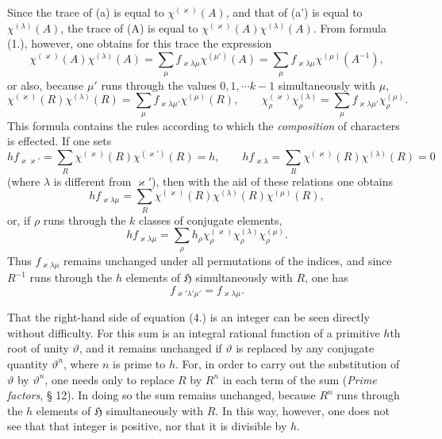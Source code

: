 \documentclass[11pt]{article}
\newcommand{\Hgr}{\mathfrak{H}}
\begin{document}
Since the trace of (a) is equal to $\chi^{(\varkappa)}(A)$, and that of (a') is equal to $\chi^{(\lambda)}(A)$, the trace of (A) is equal to $\chi^{(\varkappa)}(A)\chi^{(\lambda)}(A)$. From formula (1.), however, one obtains for this trace the expression
\[
\chi^{(\varkappa)}(A)\chi^{(\lambda)}(A)
 =\sum_\mu f_{\varkappa\lambda\mu}\chi^{(\mu')}(A)
 =\sum_\mu f_{\varkappa\lambda\mu}\chi^{(\mu)}(A^{-1}),
\]
or also, because $\mu'$ runs through the values $0,1,\cdots k-1$ simultaneously with $\mu$,
\begin{equation*}\tag{2.}
\chi^{(\varkappa)}(R)\chi^{(\lambda)}(R)
=\sum_\mu f_{\varkappa\lambda\mu'}\chi^{(\mu)}(R),
\qquad
\chi_\rho^{(\varkappa)}\chi_\rho^{(\lambda)}
=\sum_\mu f_{\varkappa\lambda\mu'}\chi_\rho^{(\mu)}.
\end{equation*}
This formula contains the rules according to which the \emph{composition} of characters is effected. If one sets
\begin{equation*}\tag{3.}
h f_{\varkappa\varkappa'}=\sum_R \chi^{(\varkappa)}(R)\chi^{(\varkappa')}(R)=h,
\qquad
h f_{\varkappa\lambda}=\sum_R \chi^{(\varkappa)}(R)\chi^{(\lambda)}(R)=0
\end{equation*}
(where $\lambda$ is different from $\varkappa'$), then with the aid of these relations one obtains
\begin{equation*}\tag{4.}
h f_{\varkappa\lambda\mu}=\sum_R \chi^{(\varkappa)}(R)\chi^{(\lambda)}(R)\chi^{(\mu)}(R),
\end{equation*}
or, if $\rho$ runs through the $k$ classes of conjugate elements,
\begin{equation*}\tag{5.}
h f_{\varkappa\lambda\mu}
=\sum_\rho h_\rho\chi_\rho^{(\varkappa)}\chi_\rho^{(\lambda)}\chi_\rho^{(\mu)}.
\end{equation*}
Thus $f_{\varkappa\lambda\mu}$ remains unchanged under all permutations of the indices, and since $R^{-1}$ runs through the $h$ elements of $\Hgr$ simultaneously with $R$, one has
\begin{equation*}\tag{6.}
f_{\varkappa'\lambda'\mu'}=f_{\varkappa\lambda\mu}.
\end{equation*}

That the right-hand side of equation (4.) is an integer can be seen directly without difficulty. For this sum is an integral rational function of a primitive $h$th root of unity $\vartheta$, and it remains unchanged if $\vartheta$ is replaced by any conjugate quantity $\vartheta^n$, where $n$ is prime to $h$. For, in order to carry out the substitution of $\vartheta$ by $\vartheta^n$, one needs only to replace $R$ by $R^n$ in each term of the sum (\emph{Prime factors}, § 12). In doing so the sum remains unchanged, because $R^n$ runs through the $h$ elements of $\Hgr$ simultaneously with $R$. In this way, however, one does not see that that integer is positive, nor that it is divisible by $h$.
\end{document}
